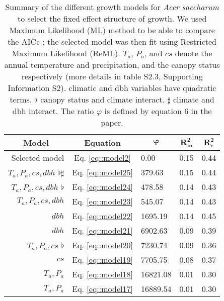 \documentclass[letterpaper, 12pt]{article}
\theoremstyle{theo}
\begin{document}
\begin{refsection}
\begin{onehalfspace}
\begin{table}
	\centering
	\caption[Summary for \textit{Acer saccharum} (growth)]{Summary of the different growth models for \textit{Acer saccharum} to select the fixed effect structure of growth. We used Maximum Likelihood (ML) method to be able to compare the AICc \citep{AICcmodavg}; the selected model was then fit using Restricted Maximum Likelihood (ReML). $ T_a $, $ P_a $, and $ cs $ denote the annual temperature and precipitation, and the canopy status respectively (more details in table S2.3, Supporting Information S2). \dag climatic and dbh variables have quadratic terms. $ \flat $ canopy status and climate interact. $ \sharp $ climate and dbh interact. The ratio $ \varphi $ is defined by equation 6 in the paper. \label{tab::acsa_fixeff}}
	\begin{tabular}{@{}rclll@{}}
	\toprule
	\multicolumn{1}{c}{\textbf{Model}} & \multicolumn{1}{c}{\textbf{Equation}} & \multicolumn{1}{c}{$ \bm{\varphi} $} & \multicolumn{1}{c}{$ \bm{R^2_m} $} & \multicolumn{1}{c}{$ \bm{R^2_c} $} \\
	\midrule
		Selected model & Eq. \ref{eq::model2} & 0.00 & 0.15 & 0.44 \\
		$ T_a, P_a, cs, dbh $ \dag $ \flat \sharp $ & Eq. \ref{eq::model25} & 379.63 & 0.15 & 0.44 \\
		$ T_a, P_a, cs, dbh $ \dag $ \flat $ & Eq. \ref{eq::model24} & 478.58 & 0.14 & 0.43 \\
		$ T_a, P_a, cs, dbh $ \dag & Eq. \ref{eq::model23} & 545.07 & 0.14 & 0.43 \\
		$ dbh $ \dag & Eq. \ref{eq::model22} & 1695.19 & 0.14 & 0.45 \\
		$ dbh $ & Eq. \ref{eq::model21} & 6902.63 & 0.09 & 0.39 \\
		$ T_a, P_a, cs $ \dag $ \flat $ & Eq. \ref{eq::model20} & 7230.74 & 0.09 & 0.36 \\
		$ cs $ & Eq. \ref{eq::model19} & 7705.75 & 0.08 & 0.37 \\
		$ T_a, P_a $ \dag & Eq. \ref{eq::model18} & 16821.08 & 0.01 & 0.30 \\
		$ T_a, P_a $ & Eq. \ref{eq::model17} & 16889.54 & 0.01 & 0.30 \\
   \bottomrule
	\end{tabular}
\end{table}


\end{onehalfspace}
\end{refsection}
\end{document}
